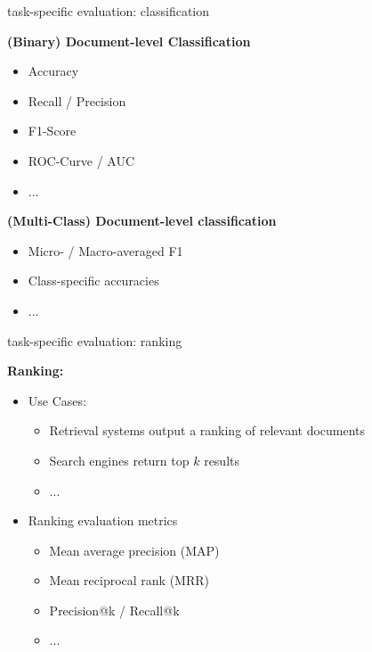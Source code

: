 
\begin{vbframe}{task-specific evaluation: classification}

\vfill

\textbf{(Binary) Document-level Classification}

\begin{itemize}
	\item Accuracy
	\item Recall / Precision
	\item F1-Score
	\item ROC-Curve / AUC
	\item ...
\end{itemize}

\textbf{(Multi-Class) Document-level classification}

\begin{itemize}
	\item Micro- / Macro-averaged F1
	\item Class-specific accuracies
	\item ...
\end{itemize}
\vfill

\end{vbframe}


\begin{vbframe}{task-specific evaluation: ranking}

\vfill

\textbf{Ranking:}

\begin{itemize}
		\item Use Cases:
				\begin{itemize}
					\item Retrieval systems output a ranking of relevant documents
					\item Search engines return top $k$ results
					\item ...
				\end{itemize}
		\item Ranking evaluation metrics
				\begin{itemize}
					\item Mean average precision (MAP)
					\item Mean reciprocal rank (MRR)
					\item Precision@k / Recall@k
					\item ...
				\end{itemize}
\end{itemize}
\vfill

\end{vbframe}


